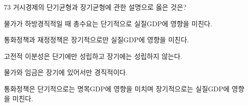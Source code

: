 \begin{question}{73}
거시경제의 단기균형과 장기균형에 관한 설명으로 옳은 것은?
\begin{choices}
  \item 물가가 하방경직적일 때 총수요는 단기적으로 실질GDP에 영향을 미친다.
  \item 통화정책과 재정정책은 장기적으로만 실질GDP에 영향을 미친다.
  \item 고전적 이분성은 단기에만 성립하고 장기에는 성립하지 않는다.
  \item 물가와 임금은 장기에 있어서만 경직적이다.
  \item 통화정책은 단기적으로는 명목GDP에 영향을 미치며 장기적으로는 실질GDP에 영향을 미친다.
\end{choices}
\end{question}
